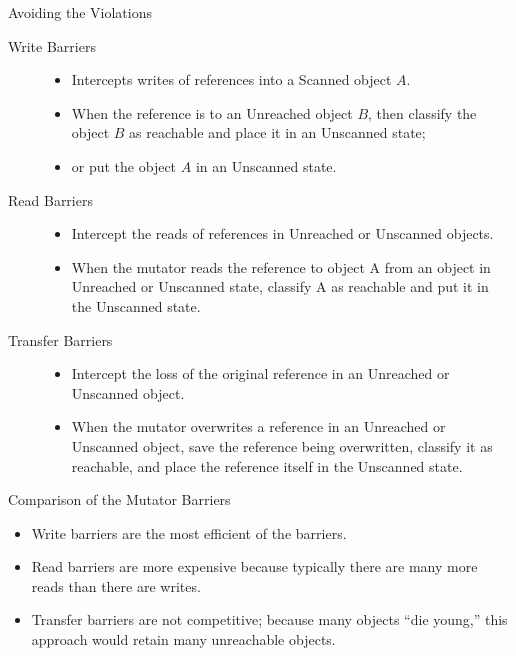 \begin{bibunit}[apalike]
\begin{frame}[allowframebreaks]{Avoiding the Violations}
	\begin{small}
	\begin{description}
	\item[Write Barriers] \begin{itemize}
		\item Intercepts writes of references into a Scanned object $A$.
		\item When the reference is to an Unreached object $B$, then classify the object $B$ as reachable and place it in an Unscanned state;
		\item or put the object $A$ in an Unscanned state.
		\end{itemize}
	\item[Read Barriers] \begin{itemize}
		\item Intercept the reads of references in Unreached or Unscanned objects.
		\item When the mutator reads the reference to object A from an object in Unreached or Unscanned state, classify A as reachable and put it in the Unscanned state.
		\end{itemize}
	\framebreak
	\item[Transfer Barriers] \begin{itemize}
		\item Intercept the loss of the original reference in an Unreached or Unscanned object.
		\item When the mutator overwrites a reference in an Unreached or Unscanned object, save the reference being overwritten, classify it as reachable, and place the reference itself in the Unscanned state.
		\end{itemize}
	\end{description}
	\end{small}
\end{frame}

\begin{frame}{Comparison of the Mutator Barriers}
	\begin{itemize}
	\item Write barriers are the most efficient of the barriers.
	\vfill
	\item Read barriers are more expensive because typically there are many more reads than there are writes.
	\vfill
	\item Transfer barriers are not competitive; because many objects ``die young,'' this approach would retain many unreachable objects.
	\end{itemize}
\end{frame}


\end{bibunit}
